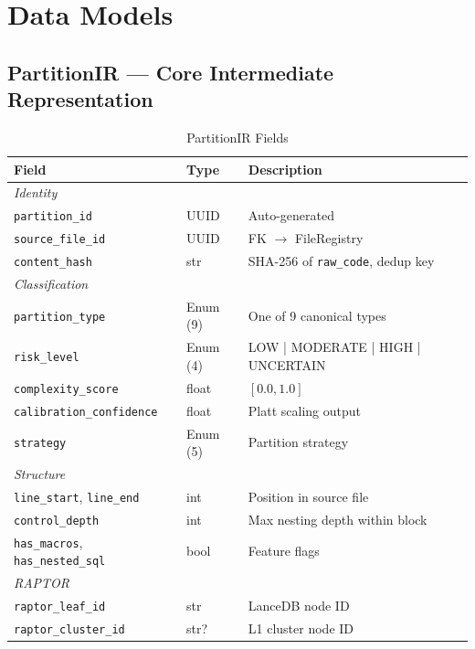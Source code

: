 \documentclass[11pt,a4paper]{article}
\begin{document}
\section{Data Models}

\subsection{PartitionIR — Core Intermediate Representation}

\begin{table}[H]
\centering
\caption{PartitionIR Fields}
\renewcommand{\arraystretch}{1.2}
\small
\begin{tabularx}{\textwidth}{@{} l l X @{}}
\toprule
\textbf{Field} & \textbf{Type} & \textbf{Description} \\
\midrule
\multicolumn{3}{l}{\textit{Identity}} \\
\texttt{partition\_id} & UUID & Auto-generated \\
\texttt{source\_file\_id} & UUID & FK $\to$ FileRegistry \\
\texttt{content\_hash} & str & SHA-256 of \texttt{raw\_code}, dedup key \\
\midrule
\multicolumn{3}{l}{\textit{Classification}} \\
\texttt{partition\_type} & Enum (9) & One of 9 canonical types \\
\texttt{risk\_level} & Enum (4) & LOW | MODERATE | HIGH | UNCERTAIN \\
\texttt{complexity\_score} & float & $[0.0, 1.0]$ \\
\texttt{calibration\_confidence} & float & Platt scaling output \\
\texttt{strategy} & Enum (5) & Partition strategy \\
\midrule
\multicolumn{3}{l}{\textit{Structure}} \\
\texttt{line\_start}, \texttt{line\_end} & int & Position in source file \\
\texttt{control\_depth} & int & Max nesting depth within block \\
\texttt{has\_macros}, \texttt{has\_nested\_sql} & bool & Feature flags \\
\midrule
\multicolumn{3}{l}{\textit{RAPTOR}} \\
\texttt{raptor\_leaf\_id} & str & LanceDB node ID \\
\texttt{raptor\_cluster\_id} & str? & L1 cluster node ID \\

\end{tabularx}
\end{table}
\end{document}
